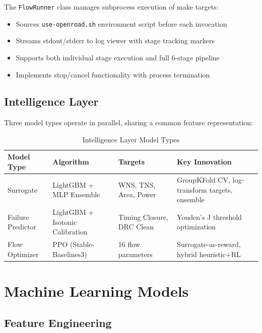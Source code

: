 \documentclass[10pt,conference]{IEEEtran}
\newcommand{\ORFS}{\text{ORFS}}
\begin{document}
The \texttt{FlowRunner} class manages subprocess execution of \ORFS{} make targets:
\begin{itemize}
    \item Sources \texttt{use-openroad.sh} environment script before each invocation
    \item Streams stdout/stderr to log viewer with stage tracking markers
    \item Supports both individual stage execution and full 6-stage pipeline
    \item Implements stop/cancel functionality with process termination
\end{itemize}

\subsection{Intelligence Layer}

Three model types operate in parallel, sharing a common feature representation:

\begin{table}[t]
\centering
\caption{Intelligence Layer Model Types}
\label{tab:model_types}
\begin{tabular}{@{}llll@{}}
\toprule
Model Type & Algorithm & Targets & Key Innovation \\
\midrule
Surrogate & LightGBM + MLP Ensemble & WNS, TNS, Area, Power & GroupKFold CV, log-transform targets, ensemble \\
Failure Predictor & LightGBM + Isotonic Calibration & Timing Closure, DRC Clean & Youden's J threshold optimization \\
Flow Optimizer & PPO (Stable-Baselines3) & 16 flow parameters & Surrogate-as-reward, hybrid heuristic+RL \\
\bottomrule
\end{tabular}
\end{table}


\section{Machine Learning Models}
\label{sec:ml_models}

\subsection{Feature Engineering}
\label{sec:feature_engineering}
\end{document}
